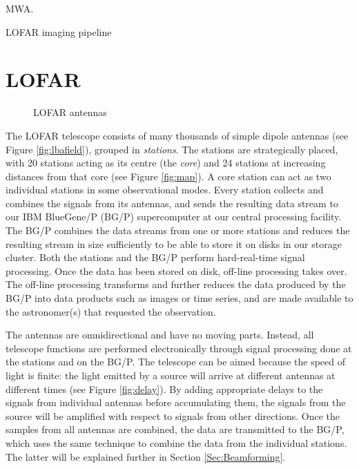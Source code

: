 \documentclass{llncs}
\begin{document}
MWA.

LOFAR imaging pipeline \cite{Romein:10a}

\section{LOFAR}
\label{Sec:LOFAR}

\begin{figure}[ht]
\hfill
{}
\hfill
{}
\caption{LOFAR antennas}
\end{figure}

The LOFAR telescope consists of many thousands of simple dipole antennas (see Figure \ref{fig:lbafield}), grouped in \emph{stations}. The stations are strategically placed, with 20 stations acting as its centre (the \emph{core}) and 24 stations at increasing distances from that core (see Figure \ref{fig:map}). A core station can act as two individual stations in some observational modes. Every station collects and combines the signals from its antennas, and sends the resulting data stream to our IBM BlueGene/P (BG/P) supercomputer at our central processing facility. The BG/P combines the data streams from one or more stations and reduces the resulting stream in size sufficiently to be able to store it on disks in our storage cluster. Both the stations and the BG/P perform hard-real-time signal processing. Once the data has been stored on disk, off-line processing takes over. The off-line processing transforms and further reduces the data produced by the BG/P into data products such as images or time series, and are made available to the astronomer(s) that requested the observation.

The antennas are omnidirectional and have no moving parts. Instead, all telescope functions are performed electronically through signal processing done at the stations and on the BG/P. The telescope can be aimed because the speed of light is finite: the light emitted by a source will arrive at different antennas at different times (see Figure \ref{fig:delay}). By adding appropriate delays to the signals from individual antennas before accumulating them, the signals from the source will be amplified with respect to signals from other directions. Once the samples from all antennas are combined, the data are transmitted to the BG/P, which uses the same technique to combine the data from the individual stations. The latter will be explained further in Section \ref{Sec:Beamforming}.
\end{document}
